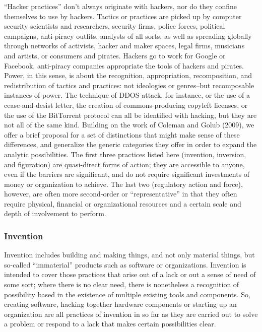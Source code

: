 \documentclass[10pt,letter,oneside]{scrartcl}
\begin{document}
``Hacker practices'' don’t always originate with hackers, nor do they confine
themselves to use by hackers.  Tactics or practices are picked up by computer
security scientists and researchers, security firms, police forces, political
campaigns, anti-piracy outfits, analysts of all sorts, as well as spreading
globally through networks of activists, hacker and maker spaces, legal firms,
musicians and artists, or consumers and pirates. Hackers go to work for Google
or Facebook, anti-piracy companies appropriate the tools of hackers and
pirates.  Power, in this sense, is about the recognition, appropriation,
recomposition, and redistribution of tactics and practices: not ideologies or
genres--but recomposable instances of power.  The technique of DDOS attack, for
instance, or the use of a cease-and-desist letter, the creation of
commons-producing copyleft licenses, or the use of the BitTorrent protocol can
all be identified with hacking, but they are not all of the same kind.
Building on the work of Coleman and Golub (2009), we offer a brief proposal for
a set of distinctions that might make sense of these differences, and
generalize the generic categories they offer in order to expand the analytic
possibilities.  The first three practices listed here (invention, inversion,
and figuration) are quasi-direct forms of action; they are accessible to
anyone, even if the barriers are significant, and do not require significant
investments of money or organization to achieve.  The last two (regulatory
action and force), however, are often more second-order or ``representative''
in that they often require physical, financial or organizational resources and
a certain scale and depth of involvement to perform. 



\subsubsection{Invention}

Invention includes building and making things, and not only material things,
but so-called ``immaterial'' products such as software or organizations.
Invention is intended to cover those practices that arise out of a lack or out
a sense of need of some sort; where there is no clear need, there is
nonetheless a recognition of possibility based in the existence of multiple
existing tools and components.  So, creating software, hacking together
hardware components or starting up an organization are all practices of
invention in so far as they are carried out to solve a problem or respond to a
lack that makes certain possibilities clear.
\end{document}
